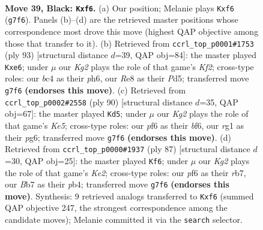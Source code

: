 \documentclass[11pt]{article}
\begin{document}
\clearpage

\begin{figure}[p]\centering
\begin{subfigure}{0.46\textwidth}\centering
\resizebox{\linewidth}{!}{%
\newchessgame
\chessboard[
  setfen={4r3/pb1p2k1/5P2/8/2B5/8/PPK2n2/2B3R1 b - - 0 39},
  showmover=false,
  pgfstyle=straightmove, color=movearrow, markmove={g7-f6}
]}
\caption{}
\end{subfigure}\hfill
\begin{subfigure}{0.46\textwidth}\centering
\resizebox{\linewidth}{!}{%
\newchessgame
\chessboard[
  setfen={8/2b2k1p/4P2P/3p2P1/8/2P4r/2KB1R2/8 b - - 0 47},
  showmover=false,
  pgfstyle=straightmove, color=movearrow, markmove={f7-e6}
]}
\caption{}
\end{subfigure}
\\[4pt]
\begin{subfigure}{0.46\textwidth}\centering
\resizebox{\linewidth}{!}{%
\newchessgame
\chessboard[
  setfen={1R6/3P2kp/5bp1/4K3/p1B5/7P/2r3P1/8 w - - 9 46},
  showmover=false,
  pgfstyle=straightmove, color=movearrow, markmove={e5-d5}
]}
\caption{}
\end{subfigure}\hfill
\begin{subfigure}{0.46\textwidth}\centering
\resizebox{\linewidth}{!}{%
\newchessgame
\chessboard[
  setfen={8/1R2k3/P7/8/1P1pp1b1/r5P1/7P/5BK1 b - - 2 44},
  showmover=false,
  pgfstyle=straightmove, color=movearrow, markmove={e7-f6}
]}
\caption{}
\end{subfigure}
\caption{\textbf{Move 39, Black: \texttt{Kxf6}.} (a) Our position; Melanie plays \texttt{Kxf6} (\texttt{g7f6}). Panels (b)--(d) are the retrieved master positions whose correspondence most drove this move (highest QAP objective among those that transfer to it). (b) Retrieved from \texttt{ccrl\_top\_p0001\#1753} (ply 93) [structural distance $d$=39, QAP obj=84]: the master played \texttt{Kxe6}; under $\mu$ our \emph{Kg2} plays the role of that game's \emph{Kf2}; cross-type roles: our \emph{b}c4 as their \emph{p}h6, our \emph{R}e8 as their \emph{P}d5; transferred move \texttt{g7f6} \textbf{(endorses this move)}. (c) Retrieved from \texttt{ccrl\_top\_p0002\#2558} (ply 90) [structural distance $d$=35, QAP obj=67]: the master played \texttt{Kd5}; under $\mu$ our \emph{Kg2} plays the role of that game's \emph{Ke5}; cross-type roles: our \emph{p}f6 as their \emph{b}f6, our \emph{r}g1 as their \emph{p}g6; transferred move \texttt{g7f6} \textbf{(endorses this move)}. (d) Retrieved from \texttt{ccrl\_top\_p0000\#1937} (ply 87) [structural distance $d$=30, QAP obj=25]: the master played \texttt{Kf6}; under $\mu$ our \emph{Kg2} plays the role of that game's \emph{Ke2}; cross-type roles: our \emph{p}f6 as their \emph{r}b7, our \emph{B}b7 as their \emph{p}b4; transferred move \texttt{g7f6} \textbf{(endorses this move)}. Synthesis: 9 retrieved analogs transferred to \texttt{Kxf6} (summed QAP objective 247, the strongest correspondence among the candidate moves); Melanie committed it via the \texttt{search} selector.}
\label{fig:thought-m77}
\end{figure}
\end{document}
